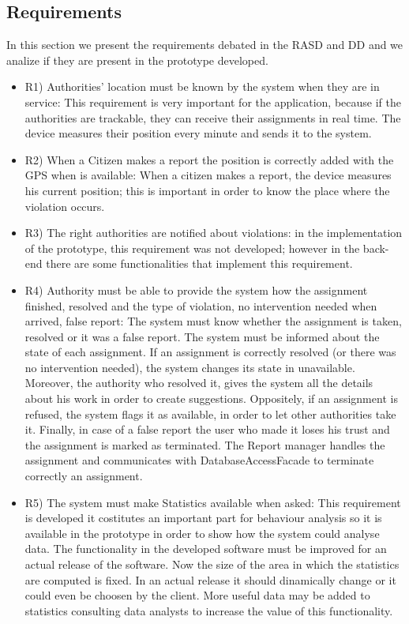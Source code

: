 \subsection{Requirements}
In this section we present the requirements debated in the RASD and DD and we analize if they are present in the prototype developed.
\begin{itemize}
\item R1) Authorities’ location must be known by the system when they are in service:
This requirement is very important for the application, because if the authorities are trackable, they can receive their assignments in real time. The device measures their position every minute and sends it to the system.
\item R2) When a Citizen makes a report the position is correctly added with the GPS when is available:
When a citizen makes a report, the device measures his current position; this is important in order to know the place where the violation occurs.
\item R3) The right authorities are notified about violations: in the implementation of the prototype, this requirement was not developed; however in the back-end there are some functionalities that implement this requirement.
\item R4) Authority must be able to provide the system how the assignment finished, resolved and the type of violation, no intervention needed when arrived, false report: 
The system must know whether the assignment is taken, resolved or it was a false report.
The system must be informed about the state of each assignment. If an assignment is correctly resolved (or there was no intervention needed), the system changes its state in unavailable. Moreover, the authority who resolved it, gives the system all the details about his work in order to create suggestions. Oppositely, if an assignment is refused, the system flags it as available, in order to let other authorities take it. Finally, in case of a false report the user who made it loses his trust and the assignment is marked as terminated. The Report manager handles the assignment and communicates with DatabaseAccessFacade to terminate correctly an assignment.


\item R5) The system must make Statistics available when asked: This requirement is developed it costitutes an important part
for behaviour analysis so it is available in the prototype in order to show how the system could analyse data.
The functionality in the developed software must be improved for an actual release of the software. Now the size of the area in which the statistics are computed is fixed. In an actual release it should dinamically change or it could even be choosen by the client. More useful data may be added to statistics consulting data analysts to increase the value of this functionality.


\end{itemize}
